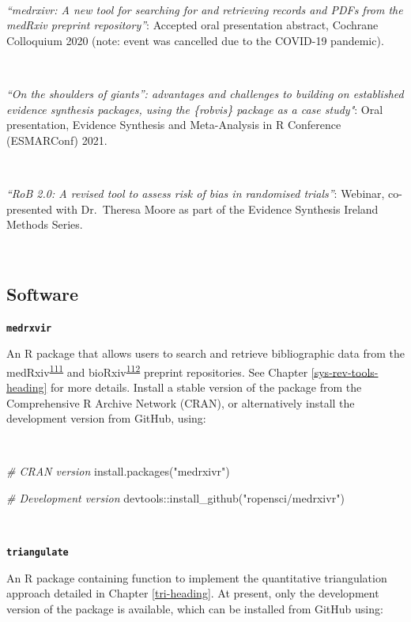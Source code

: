 \documentclass[a4paper, twoside]{templates/ociamthesis}
\newenvironment{Shaded}{\begin{snugshade}}{\end{snugshade}}
\newcommand{\CommentTok}[1]{\textcolor[rgb]{0.56,0.35,0.01}{\textit{#1}}}
\newcommand{\FunctionTok}[1]{\textcolor[rgb]{0.00,0.00,0.00}{#1}}
\newcommand{\NormalTok}[1]{#1}
\newcommand{\SpecialCharTok}[1]{\textcolor[rgb]{0.00,0.00,0.00}{#1}}
\newcommand{\StringTok}[1]{\textcolor[rgb]{0.31,0.60,0.02}{#1}}
\renewenvironment{Shaded}
{
  \vspace{4pt}%
  \begin{snugshade}%
}{%
  \end{snugshade}%
  \vspace{4pt}%
}
\begin{document}
~

\emph{``medrxivr: A new tool for searching for and retrieving records and PDFs from the medRxiv preprint repository''}: Accepted oral presentation abstract, Cochrane Colloquium 2020 (note: event was cancelled due to the COVID-19 pandemic).

~

\emph{``On the shoulders of giants'': advantages and challenges to building on established evidence synthesis packages, using the \{robvis\} package as a case study"}: Oral presentation, Evidence Synthesis and Meta-Analysis in R Conference (ESMARConf) 2021.

~

\emph{``RoB 2.0: A revised tool to assess risk of bias in randomised trials''}: Webinar, co-presented with Dr.~Theresa Moore as part of the Evidence Synthesis Ireland Methods Series.

~

\hypertarget{outputs-software}{%
\subsection{Software}\label{outputs-software}}

\textbf{\texttt{medrxvir}}

An R package that allows users to search and retrieve bibliographic data from the medRxiv\textsuperscript{\protect\hyperlink{ref-rawlinson2019}{111}} and bioRxiv\textsuperscript{\protect\hyperlink{ref-sever2019}{112}} preprint repositories. See Chapter \ref{sys-rev-tools-heading} for more details. Install a stable version of the package from the Comprehensive R Archive Network (CRAN), or alternatively install the development version from GitHub, using:

~

\begin{Shaded}
\begin{Highlighting}[]
\CommentTok{\# CRAN version}
\FunctionTok{install.packages}\NormalTok{(}\StringTok{"medrxivr"}\NormalTok{)}

\CommentTok{\# Development version}
\NormalTok{devtools}\SpecialCharTok{::}\FunctionTok{install\_github}\NormalTok{(}\StringTok{"ropensci/medrxivr"}\NormalTok{)}
\end{Highlighting}
\end{Shaded}

~

\textbf{\texttt{triangulate}}

An R package containing function to implement the quantitative triangulation approach detailed in Chapter \ref{tri-heading}. At present, only the development version of the package is available, which can be installed from GitHub using:
\end{document}
